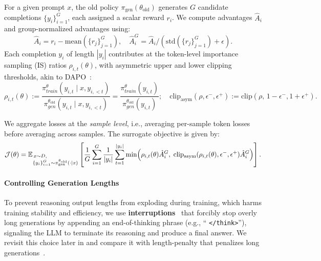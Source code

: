 For a given prompt $x$, the old policy $\pi_{\text{gen}}(\theta_{\text{old}})$ generates $G$ candidate completions $\{y_i\}_{i=1}^G$, each assigned a scalar reward $r_i$. 
We compute advantages $\hat{A}_i$ and group-normalized advantages using:
\begin{equation*}
    \hat{A}_i = r_i - \mathrm{mean}(\{r_j\}_{j=1}^G),  \quad
    \hat{A}_i^{G} = \hat{A}_i/(\mathrm{std}(\{r_j\}_{j=1}^G) + \epsilon).
\end{equation*}
Each completion $y_i$ of length $|y_i|$ contributes at the token-level importance sampling (IS) ratios $\rho_{i,t}(\theta)$, with asymmetric upper and lower clipping thresholds, akin to DAPO~\citep{yu2025dapo}:
\begin{equation}
    \rho_{i,t}(\theta) := \frac{\pi^\theta_{train}(y_{i,t} \mid x, y_{i,<t})}{\pi^{\theta_{\text{old}}}_{gen}(y_{i,t} \mid x, y_{i,<t})} = \frac{\pi^\theta_{train}(y_{i,t})}{\pi^{\theta_{\text{old}}}_{gen}(y_{i,t})}; \quad \mathrm{clip}_{\mathrm{asym}}(\rho, \epsilon^-, \epsilon^+) := \mathrm{clip}(\rho,\, 1-\epsilon^-, 1+\epsilon^+).
    \label{eq:is}
\end{equation}

We aggregate losses at the \emph{sample level}, i.e., averaging per-sample token losses before averaging across samples. 
The surrogate objective is given by:
\begin{equation}\label{eq:grpo_loss}
    \mathcal{J}(\theta) 
    = \mathbb{E}_{\begin{subarray}{l} \, x \sim D, \\ \{y_i\}_{i=1}^G \sim {\pi_{\text{gen}}^{\theta_{\text{old}}}(\cdot \mid x)} \end{subarray}}
    \left[ \frac{1}{G} \sum_{i=1}^G \frac{1}{|y_i|} \sum_{t=1}^{|y_i|}
    \min\!\left( \rho_{i,t}(\theta)\hat{A}_i^{G},\; \mathrm{clip_{asym}}(\rho_{i,t}(\theta), \epsilon^-, \epsilon^+)\hat{A}_i^{G} \right) \right].
\end{equation}


\paragraph{Controlling Generation Lengths}  
To prevent reasoning output lengths from exploding during training, which harms training stability and efficiency, we use \textbf{interruptions}~\citep{glm_4.1v,qwen3technicalreport} that forcibly stop overly long generations by appending an end-of-thinking phrase (e.g., `` \texttt{</think>}''), signaling the LLM to terminate its reasoning and produce a final answer. We revisit this choice later in  and compare it with length-penalty that penalizes long generations~\citep{yu2025dapo,team2025kimi}.




